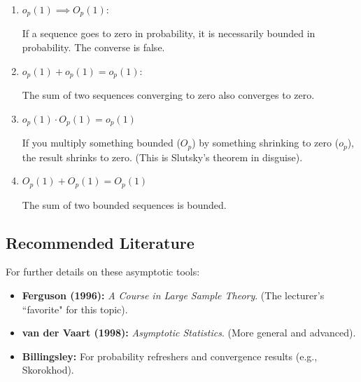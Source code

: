 \begin{enumerate}[label=\roman*)]
    \item $o_p(1) \implies O_p(1)$:

    If a sequence goes to zero in probability, it is necessarily bounded in probability. The converse is false.

    \item $o_p(1) + o_p(1) = o_p(1)$: 

     The sum of two sequences converging to zero also converges to zero.

    \item $o_p(1) \cdot O_p(1) = o_p(1)$

         If you multiply something bounded ($O_p$) by something shrinking to zero ($o_p$), the result shrinks to zero. (This is Slutsky's theorem in disguise).

    \item $O_p(1) + O_p(1) = O_p(1)$

         The sum of two bounded sequences is bounded.
\end{enumerate}

\subsection*{Recommended Literature}
For further details on these asymptotic tools:
\begin{itemize}
    \item \textbf{Ferguson (1996):} \textit{A Course in Large Sample Theory}. (The lecturer's ``favorite" for this topic).
    \item \textbf{van der Vaart (1998):} \textit{Asymptotic Statistics}. (More general and advanced).
    \item \textbf{Billingsley:} For probability refreshers and convergence results (e.g., Skorokhod).
\end{itemize}
